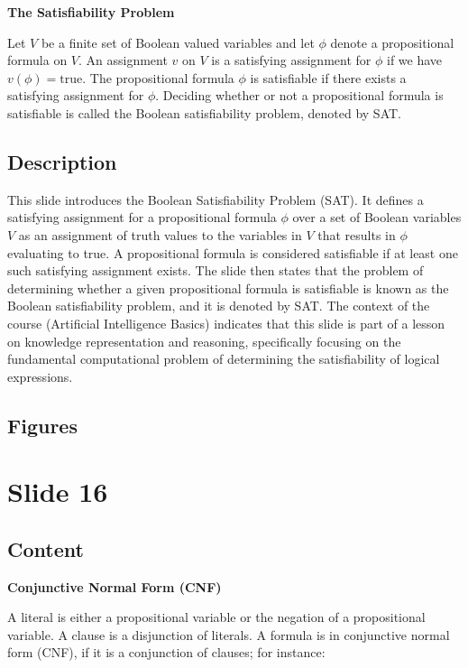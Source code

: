 \documentclass{article}%
\begin{document}
\textbf{The Satisfiability Problem}

Let $V$ be a finite set of Boolean valued variables and let $\phi$ denote a propositional formula on $V$.
An assignment $v$ on $V$ is a satisfying assignment for $\phi$ if we have $v(\phi) = \text{true}$.
The propositional formula $\phi$ is satisfiable if there exists a satisfying assignment for $\phi$.
Deciding whether or not a propositional formula is satisfiable is called the Boolean satisfiability problem, denoted by SAT.
%
\subsection{Description}%
This slide introduces the Boolean Satisfiability Problem (SAT).  It defines a satisfying assignment for a propositional formula $\phi$ over a set of Boolean variables $V$ as an assignment of truth values to the variables in $V$ that results in $\phi$ evaluating to true.  A propositional formula is considered satisfiable if at least one such satisfying assignment exists.  The slide then states that the problem of determining whether a given propositional formula is satisfiable is known as the Boolean satisfiability problem, and it is denoted by SAT.  The context of the course (Artificial Intelligence Basics) indicates that this slide is part of a lesson on knowledge representation and reasoning, specifically focusing on the fundamental computational problem of determining the satisfiability of logical expressions.%
\subsection{Figures}%
\begin{figure}[H]%
\centering%
\end{figure}

%
\newpage%
\section{Slide 16}%
\label{sec:Slide16}%
\subsection{Content}%

\textbf{Conjunctive Normal Form (CNF)}

A literal is either a propositional variable or the negation of a propositional variable.
A clause is a disjunction of literals.
A formula is in conjunctive normal form (CNF), if it is a conjunction of clauses; for instance:
\end{document}
